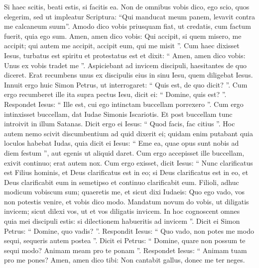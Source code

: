 \begin{biblechapter}
\begin{biblechapter}
\begin{biblechapter}
\begin{biblechapter}
\begin{biblechapter}
\begin{biblechapter}
\begin{biblechapter}
\begin{biblechapter}
\begin{biblechapter}
\begin{biblechapter}
\begin{biblechapter}
\begin{biblechapter}
\begin{biblechapter}
\verse Si haec scitis, beati estis, si facitis ea. 
\verse Non de omnibus vobis dico, ego scio, quos elegerim, sed ut impleatur Scriptura: “Qui manducat meum panem, levavit contra me calcaneum suum”. 
\verse Amodo dico vobis priusquam fiat, ut credatis, cum factum fuerit, quia ego sum. 
\verse Amen, amen dico vobis: Qui accipit, si quem misero, me accipit; qui autem me accipit, accipit eum, qui me misit ”.
 \verse Cum haec dixisset Iesus, turbatus est spiritu et protestatus est et dixit: “ Amen, amen dico vobis: Unus ex vobis tradet me ”. 
\verse Aspiciebant ad invicem discipuli, haesitantes de quo diceret. 
\verse Erat recumbens unus ex discipulis eius in sinu Iesu, quem diligebat Iesus. 
\verse Innuit ergo huic Simon Petrus, ut interrogaret: “ Quis est, de quo dicit? ”. 
\verse Cum ergo recumberet ille ita supra pectus Iesu, dicit ei: “ Domine, quis est? ”. 
\verse Respondet Iesus: “ Ille est, cui ego intinctam buccellam porrexero ”. Cum ergo intinxisset buccellam, dat Iudae Simonis Iscariotis. 
\verse Et post buccellam tunc introivit in illum Satanas. Dicit ergo ei Iesus: “ Quod facis, fac citius ”. 
\verse Hoc autem nemo scivit discumbentium ad quid dixerit ei; 
\verse quidam enim putabant quia loculos habebat Iudas, quia dicit ei Iesus: “ Eme ea, quae opus sunt nobis ad diem festum ”, aut egenis ut aliquid daret. 
\verse Cum ergo accepisset ille buccellam, exivit continuo; erat autem nox.
 \verse Cum ergo exisset, dicit Iesus: “ Nunc clarificatus est Filius hominis, et Deus clarificatus est in eo; 
\verse si Deus clarificatus est in eo, et Deus clarificabit eum in semetipso et continuo clarificabit eum. 
\verse Filioli, adhuc modicum vobiscum sum; quaeretis me, et sicut dixi Iudaeis: Quo ego vado, vos non potestis venire, et vobis dico modo. 
\verse Mandatum novum do vobis, ut diligatis invicem; sicut dilexi vos, ut et vos diligatis invicem. 
\verse In hoc cognoscent omnes quia mei discipuli estis: si dilectionem habueritis ad invicem ”.
 \verse Dicit ei Simon Petrus: “ Domine, quo vadis? ”. Respondit Iesus: “ Quo vado, non potes me modo sequi, sequeris autem postea ”. 
\verse Dicit ei Petrus: “ Domine, quare non possum te sequi modo? Animam meam pro te ponam ”. 
\verse Respondet Iesus: “ Animam tuam pro me pones? Amen, amen dico tibi: Non cantabit gallus, donec me ter neges.
 

\end{biblechapter}
\end{biblechapter}
\end{biblechapter}
\end{biblechapter}
\end{biblechapter}
\end{biblechapter}
\end{biblechapter}
\end{biblechapter}
\end{biblechapter}
\end{biblechapter}
\end{biblechapter}
\end{biblechapter}
\end{biblechapter}
